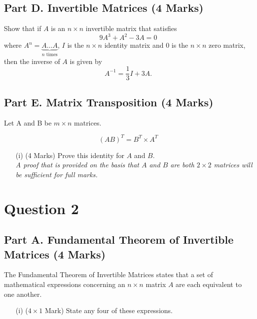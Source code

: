 \documentclass[a4paper,12pt]{article}
\begin{document}
			\subsection*{Part D. Invertible Matrices (4 Marks)}	
	\noindent	Show that if $A$ is an $n\times n$ invertible matrix that satisfies 
	$$
	9A^3+A^2-3A=0
	$$
	where $A^n=\underbrace{A\ldots A}_{\textrm{$n$ times}}$, %
	$I$ is the $n\times n$  identity matrix and $0$ is the $n\times n$  zero matrix,
	then the inverse of $A$ is given by  %
	$$
	A^{-1}=\frac13I+3A.
	$$
		\smallskip
		\subsection*{Part E. Matrix Transposition (4 Marks)}	
Let A and B be $m \times n$ matrices. 
	
\[	(AB)^{T} = B^T \times A^T\]

\begin{itemize}
\item[(i)] (4 Marks) Prove this identity for $A$ and $B$.\\ \smallskip \textit{A proof that is provided on the basis that $A$ and $B$ are both $2 \times 2$ matrices will be sufficient for full marks.}
\end{itemize}
\newpage
\section*{Question 2}
	\subsection*{Part A. Fundamental Theorem of Invertible Matrices  (4 Marks)}
	The Fundamental Theorem of Invertible Matrices states that a set of mathematical expressions concerning an $n\times n$ matrix $A$ are each equivalent to one another.
	
	\begin{itemize}
		\item[(i)] ($4 \times 1$ Mark)
		State any four of these expressions.
	\end{itemize}
	
\end{document}
